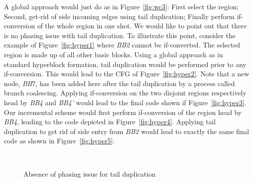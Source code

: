 A global approach would just do as in Figure~\ref{fig:wc3}: 
First select the region; 
Second, get-rid of side incoming edges using tail duplication; 
Finally perform if-conversion of the whole region in one shot. 
We would like to point out that there is no phasing issue with tail duplication. 
To illustrate this point, consider the example of Figure~\ref{fig:hyper1} where \textit{BB2} cannot be if-converted. 
The selected region is made up of all other basic blocks. 
Using a global approach as in standard hyperblock formation, tail duplication would be performed prior to any if-conversion. 
This would lead to the CFG of Figure~\ref{fig:hyper2}. 
Note that a new node, \textit{BB}7, has been added here after the tail duplication by a process called branch coalescing. 
Applying if-conversion on the two disjoint regions respectively head by \textit{BB4} and \textit{BB4'} would lead to the final code shown if Figure~\ref{fig:hyper3}. 
Our incremental scheme would first perform if-conversion of the region head by \textit{BB4}, leading to the code depicted in Figure~\ref{fig:hyper4}. 
Applying tail duplication to get rid of side entry from \textit{BB2} would lead to exactly the same final code as shown in Figure~\ref{fig:hyper5}.

\begin{figure}[h]
  \hfill
  \hfill
  \\
  \hfill
  \hfill
 \caption{Absence of phasing issue for tail duplication\label{fig:hyper}}
\end{figure}


